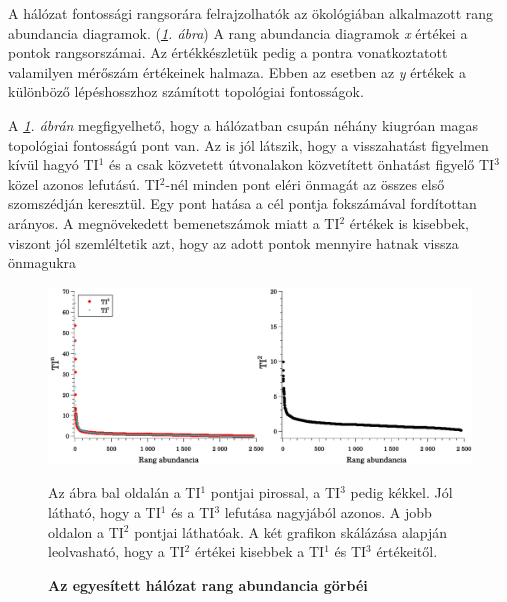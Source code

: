\documentclass[a4paper,12pt]{article}
\newenvironment{imgdesc}{
		\small
		\singlespacing
		\begin{center}
		
	}{
		\end{center}	
	}
\begin{document}
			A hálózat fontossági rangsorára felrajzolhatók az ökológiában alkalmazott rang abundancia diagramok.  (\textit{\ref{fig:mergedTIs}. ábra}) A rang abundancia diagramok \textit{x} értékei a pontok rangsorszámai. Az értékkészletük pedig a pontra vonatkoztatott valamilyen mérőszám értékeinek halmaza. Ebben az esetben az \textit{y} értékek a különböző lépéshosszhoz számított topológiai fontosságok.
			
			A \textit{\ref{fig:mergedTIs}. ábrán} megfigyelhető, hogy a hálózatban csupán néhány kiugróan magas topológiai fontosságú pont van. Az is jól látszik, hogy a visszahatást figyelmen kívül hagyó TI$^1$ és a csak közvetett útvonalakon közvetített önhatást figyelő TI$^3$ közel azonos lefutású. TI$^2$-nél minden pont eléri önmagát az összes első szomszédján keresztül. Egy pont hatása a cél pontja fokszámával fordítottan arányos. A megnövekedett bemenetszámok miatt a TI$^2$ értékek is kisebbek, viszont jól szemléltetik azt, hogy az adott pontok mennyire hatnak vissza önmagukra			
			
			\begin{figure}[H]
				\includegraphics[scale=0.5]{img/mergedTIs.pdf}
				\centering
				\caption{\textbf{ Az egyesített hálózat rang abundancia görbéi}}
				\begin{imgdesc}
					Az ábra bal oldalán a TI$^1$ pontjai pirossal, a TI$^3$ pedig kékkel. Jól látható, hogy a TI$^1$ és a TI$^3$ lefutása nagyjából azonos. A jobb oldalon a TI$^2$ pontjai láthatóak. A két grafikon skálázása alapján leolvasható, hogy a TI$^2$ értékei kisebbek a TI$^1$ és TI$^3$ értékeitől.
				\end{imgdesc}
	
				\label{fig:mergedTIs}			 		 
			\end{figure}
\end{document}
